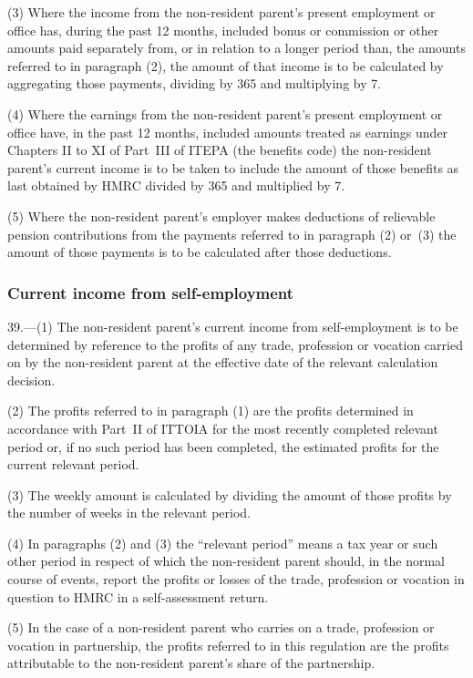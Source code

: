 \documentclass[12pt,a4paper]{article}
\begin{document}
(3) Where the income from the non-resident parent’s present employment or office has, during the past 12 months, included bonus or commission or other amounts paid separately from, or in relation to a longer period than, the amounts referred to in paragraph (2), the amount of that income is to be calculated by aggregating those payments, dividing by 365 and multiplying by 7.

(4) Where the earnings from the non-resident parent’s present employment or office have, in the past 12 months, included amounts treated as earnings under Chapters II to XI of Part~III of ITEPA (the benefits code) the non-resident parent’s current income is to be taken to include the amount of those benefits as last obtained by HMRC divided by 365 and multiplied by 7.

(5) Where the non-resident parent’s employer makes deductions of relievable pension contributions from the payments referred to in paragraph (2) or~(3) the amount of those payments is to be calculated after those deductions.

\subsubsection[39. Current income from self-employment]{Current income from self-employment}

39.---(1)  The non-resident parent’s current income from self-employment is to be determined by reference to the profits of any trade, profession or vocation carried on by the non-resident parent at the effective date of the relevant calculation decision.

(2) The profits referred to in paragraph (1) are the profits determined in accordance with Part~II of ITTOIA for the most recently completed relevant period or, if no such period has been completed, the estimated profits for the current relevant period.

(3) The weekly amount is calculated by dividing the amount of those profits by the number of weeks in the relevant period.

(4) In paragraphs (2) and (3) the “relevant period” means a tax year or such other period in respect of which the non-resident parent should, in the normal course of events, report the profits or losses of the trade, profession or vocation in question to HMRC in a self-assessment return.

(5) In the case of a non-resident parent who carries on a trade, profession or vocation in partnership, the profits referred to in this regulation are the profits attributable to the non-resident parent’s share of the partnership.
\end{document}
